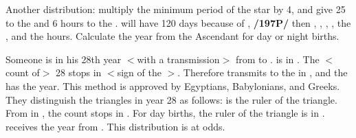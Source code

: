Another distribution: multiply the minimum period of the star by 4, and give 25 to the \Moon and 6
hours to the \Sun. \Saturn\xspace will have 120 days because of \Capricorn, \textbf{/197P/} then \Mercury\xspace 80, \Venus\xspace 32, \Jupiter\xspace 48, \Mars\xspace 60, the \Moon\xspace 25, and the \Sun\xspace 6 hours. Calculate the year from the Ascendant for day or night births. 

Someone is in his 28th year $<$with a transmission$>$ from \Libra\xspace to \Capricorn. \Saturn\xspace is in
\Libra. The $<$count of$>$ 28 stops in \Leo $<$sign of the \Sun$>$. Therefore \Saturn\xspace transmits to the \Sun\xspace in \Libra, and the \Sun\xspace has the year. This method is approved by Egyptians, Babylonians, and Greeks. They distinguish the triangles in year 28 as follows: \Venus\xspace is the ruler of the triangle. From \Venus\xspace in \Cancer, the count stops in \Libra. For day births, the ruler of the triangle is \Saturn\xspace in \Libra. \Saturn\xspace receives the year from \Venus. This distribution is at odds.

\newpage
